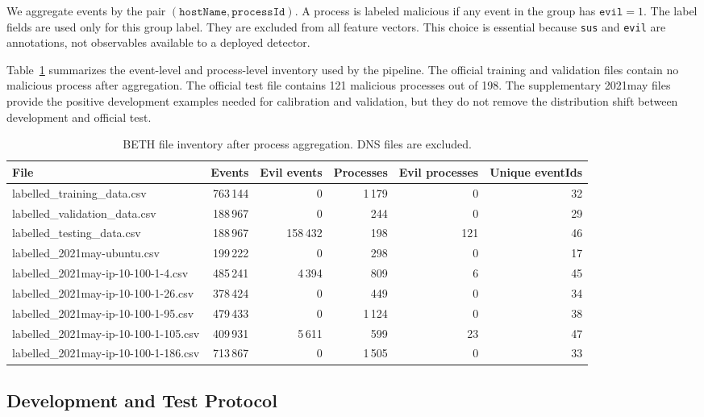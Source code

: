 \documentclass[journal]{IEEEtran}
\begin{document}
We aggregate events by the pair $(\texttt{hostName}, \texttt{processId})$. A process is labeled malicious if any event in the group has $\texttt{evil}=1$. The label fields are used only for this group label. They are excluded from all feature vectors. This choice is essential because \texttt{sus} and \texttt{evil} are annotations, not observables available to a deployed detector.

Table~\ref{tab:file_inventory} summarizes the event-level and process-level inventory used by the pipeline. The official training and validation files contain no malicious process after aggregation. The official test file contains 121 malicious processes out of 198. The supplementary 2021may files provide the positive development examples needed for calibration and validation, but they do not remove the distribution shift between development and official test.

\begin{table}[t]
\centering
\caption{BETH file inventory after process aggregation. DNS files are excluded.}
\label{tab:file_inventory}
\begin{tabular}{lrrrrr}
\toprule
\textbf{File} & \textbf{Events} & \textbf{Evil events} & \textbf{Processes} & \textbf{Evil processes} & \textbf{Unique eventIds} \\
\midrule
labelled\_training\_data.csv & 763\,144 & 0 & 1\,179 & 0 & 32 \\
labelled\_validation\_data.csv & 188\,967 & 0 & 244 & 0 & 29 \\
labelled\_testing\_data.csv & 188\,967 & 158\,432 & 198 & 121 & 46 \\
labelled\_2021may-ubuntu.csv & 199\,222 & 0 & 298 & 0 & 17 \\
labelled\_2021may-ip-10-100-1-4.csv & 485\,241 & 4\,394 & 809 & 6 & 45 \\
labelled\_2021may-ip-10-100-1-26.csv & 378\,424 & 0 & 449 & 0 & 34 \\
labelled\_2021may-ip-10-100-1-95.csv & 479\,433 & 0 & 1\,124 & 0 & 38 \\
labelled\_2021may-ip-10-100-1-105.csv & 409\,931 & 5\,611 & 599 & 23 & 47 \\
labelled\_2021may-ip-10-100-1-186.csv & 713\,867 & 0 & 1\,505 & 0 & 33 \\
\bottomrule
\end{tabular}
\end{table}

\subsection{Development and Test Protocol}
\end{document}
